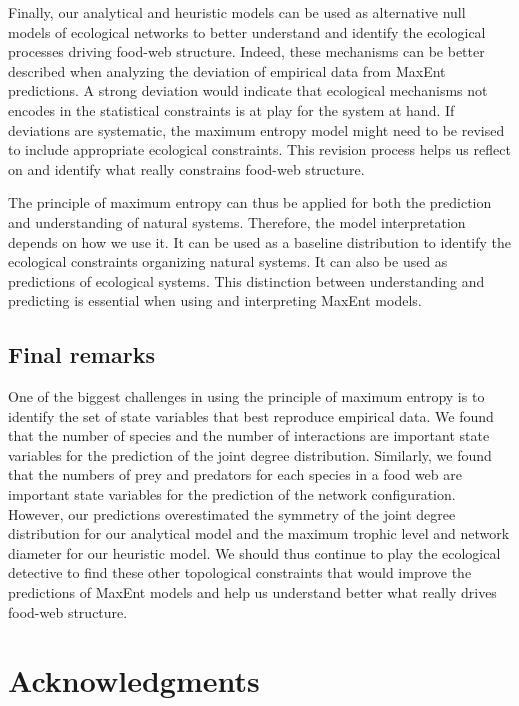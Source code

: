 \documentclass[10pt,oneside]{article}
\begin{document}
Finally, our analytical and heuristic models can be used as alternative
null models of ecological networks to better understand and identify the
ecological processes driving food-web structure. Indeed, these
mechanisms can be better described when analyzing the deviation of
empirical data from MaxEnt predictions. A strong deviation would
indicate that ecological mechanisms not encodes in the statistical
constraints is at play for the system at hand. If deviations are
systematic, the maximum entropy model might need to be revised to
include appropriate ecological constraints. This revision process helps
us reflect on and identify what really constrains food-web structure.

The principle of maximum entropy can thus be applied for both the
prediction and understanding of natural systems. Therefore, the model
interpretation depends on how we use it. It can be used as a baseline
distribution to identify the ecological constraints organizing natural
systems. It can also be used as predictions of ecological systems. This
distinction between understanding and predicting is essential when using
and interpreting MaxEnt models.

\hypertarget{final-remarks}{%
\subsection{Final remarks}\label{final-remarks}}

One of the biggest challenges in using the principle of maximum entropy
is to identify the set of state variables that best reproduce empirical
data. We found that the number of species and the number of interactions
are important state variables for the prediction of the joint degree
distribution. Similarly, we found that the numbers of prey and predators
for each species in a food web are important state variables for the
prediction of the network configuration. However, our predictions
overestimated the symmetry of the joint degree distribution for our
analytical model and the maximum trophic level and network diameter for
our heuristic model. We should thus continue to play the ecological
detective to find these other topological constraints that would improve
the predictions of MaxEnt models and help us understand better what
really drives food-web structure.

\hypertarget{acknowledgments}{%
\section{Acknowledgments}\label{acknowledgments}}
\end{document}
